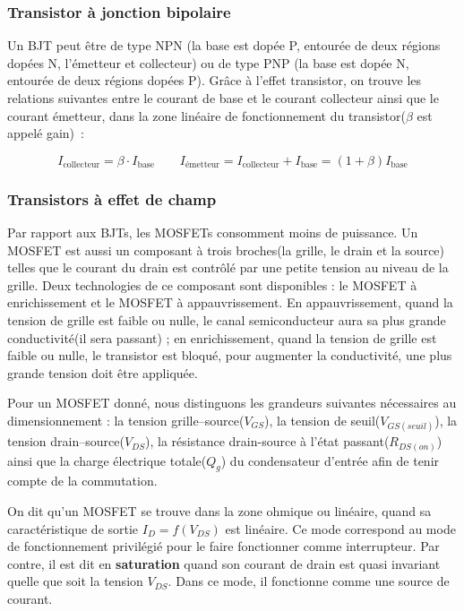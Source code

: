 \documentclass[a4paper,12pt,twoside]{report}
\theoremstyle{definition}
\theoremstyle{plain}
\theoremstyle{remark}
\begin{document}
\subsubsection{Transistor à jonction bipolaire}

Un \ac{BJT} peut être de type NPN (la base est dopée P, entourée de deux régions dopées N, l'émetteur et collecteur) ou de type PNP (la base est dopée N, entourée de deux régions dopées P). Grâce à l'effet transistor, on trouve les relations suivantes entre le courant de base et le courant collecteur ainsi que le courant émetteur, dans la zone linéaire de fonctionnement du transistor($\beta$ est appelé gain)~:

\[ I_{\text{collecteur}} = \beta \cdot I_{\text{base}} \qquad I_{\text{émetteur}} = I_{\text{collecteur}} + I_{\text{base}} = (1 + \beta) I_{\text{base}} \]

\subsubsection{Transistors à effet de champ}
Par rapport aux \acp{BJT}, les \acp{MOSFET} consomment moins de puissance. Un \ac{MOSFET} est aussi un composant à trois broches(la grille, le drain et la source) telles que le courant du drain est contrôlé par une petite tension au niveau de la grille. Deux technologies de ce composant sont disponibles : le \ac{MOSFET} à enrichissement et le \ac{MOSFET} à appauvrissement. En appauvrissement, quand la tension de grille est faible ou nulle, le canal semiconducteur aura sa plus grande conductivité(il sera passant) ; en enrichissement, quand la tension de grille est faible ou nulle, le transistor est bloqué, pour augmenter la conductivité, une plus grande tension doit être appliquée.

Pour un \ac{MOSFET} donné, nous distinguons les grandeurs suivantes nécessaires au dimensionnement : la tension grille--source($V_{GS}$), la tension de seuil($V_{GS(seuil)}$), la tension drain--source($V_{DS}$), la résistance drain-source à l'état passant($R_{DS(on)}$) ainsi que la charge électrique totale($Q_g$) du condensateur d'entrée afin de tenir compte de la commutation.

On dit qu'un \ac{MOSFET} se trouve dans la zone ohmique ou linéaire, quand sa caractéristique de sortie $I_D = f(V_{DS})$ est linéaire. Ce mode correspond au mode de fonctionnement privilégié pour le faire fonctionner comme interrupteur. Par contre, il est dit en \textbf{saturation} quand son courant de drain est quasi invariant quelle que soit la tension $V_{DS}$. Dans ce mode, il fonctionne comme une source de courant.
\end{document}

